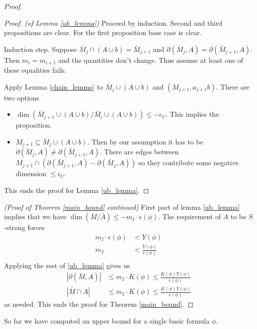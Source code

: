 \documentclass{amsart}
\begin{document}
\begin{proof}
  \begin{proof} \textit{(of Lemma \ref{ub_lemma})}
    Proceed by induction.
    Second and third propositions are clear.
    For the first proposition base case is clear.
    
    Induction step.
    Suppose $\bar M_j \cap (A \cup b) = \bar M_{j+1}$ and $\partial(\bar M_j, A) = \partial(\bar M_{j+1}, A)$.
    Then $m_i = m_{i+1}$ and the quantities don't change.
    Thus assume at least one of these equalities fails.
    
    Apply Lemma \ref{chain_lemma} to $\bar M_j \cup (A \cup b)$ and $(M_{j+1}, a_{j+1}b)$.
    There are two options
    
    \begin{itemize}
    \item $\dim(\bar M_{j+1} \cup (A \cup b) / \bar M_i \cup (A \cup b)) \leq -\epsilon_U$.
      This implies the proposition.
    \item $M_{j+1} \subseteq \bar M_j \cup (A \cup b)$.
      Then by our assumption it has to be $\partial(\bar M_j, A) \neq \partial(\bar M_{j+1}, A)$.
      There are edges between $M_{j+1} \cap (\partial(\bar M_{j+1}, A) - \partial(\bar M_j, A))$ so they contribute some negative dimension $\leq \epsilon_U$.
    \end{itemize}
    This ends the proof for Lemma \ref{ub_lemma}.
  \end{proof}
  \textit{(Proof of Theorem \ref{main_bound} continued)}
  First part of lemma \ref{ub_lemma} implies that we have $\dim(\bar M / \bar A) \leq -m_I \cdot \epsilon(\phi)$.
  The requirement of $A$ to be $S$-strong forces
  \begin{align*}
    m_I \cdot \epsilon(\phi) &< Y(\phi) \\
    m_I  &< \frac{Y(\phi)}{\epsilon(\phi)} \\
  \end{align*}
  Applying the rest of \ref{ub_lemma} gives us
  \begin{align*}
    |\partial(\bar M, A)| &\leq m_I \cdot K(\phi) \leq \frac{K(\phi)Y(\phi)}{\epsilon(\phi)} \\
    |\bar M \cap A| &\leq m_I \cdot K(\phi) \leq \frac{K(\phi)Y(\phi)}{\epsilon(\phi)}
  \end{align*}
  as needed.
  This ends the proof for Theorem \ref{main_bound}.
\end{proof}

So far we have computed an upper bound for a single basic formula $\phi$.
\end{document}
